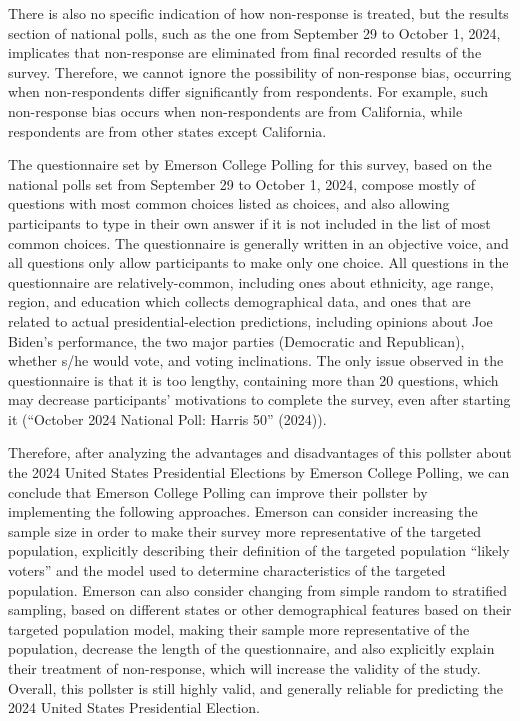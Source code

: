 \documentclass[
  letterpaper,
  DIV=11,
  numbers=noendperiod]{scrartcl}
\begin{document}
There is also no specific indication of how non-response is treated, but
the results section of national polls, such as the one from September 29
to October 1, 2024, implicates that non-response are eliminated from
final recorded results of the survey. Therefore, we cannot ignore the
possibility of non-response bias, occurring when non-respondents differ
significantly from respondents. For example, such non-response bias
occurs when non-respondents are from California, while respondents are
from other states except California.

The questionnaire set by Emerson College Polling for this survey, based
on the national polls set from September 29 to October 1, 2024, compose
mostly of questions with most common choices listed as choices, and also
allowing participants to type in their own answer if it is not included
in the list of most common choices. The questionnaire is generally
written in an objective voice, and all questions only allow participants
to make only one choice. All questions in the questionnaire are
relatively-common, including ones about ethnicity, age range, region,
and education which collects demographical data, and ones that are
related to actual presidential-election predictions, including opinions
about Joe Biden's performance, the two major parties (Democratic and
Republican), whether s/he would vote, and voting inclinations. The only
issue observed in the questionnaire is that it is too lengthy,
containing more than 20 questions, which may decrease participants'
motivations to complete the survey, even after starting it ({``October
2024 National Poll: Harris 50''} (2024)).

Therefore, after analyzing the advantages and disadvantages of this
pollster about the 2024 United States Presidential Elections by Emerson
College Polling, we can conclude that Emerson College Polling can
improve their pollster by implementing the following approaches. Emerson
can consider increasing the sample size in order to make their survey
more representative of the targeted population, explicitly describing
their definition of the targeted population ``likely voters'' and the
model used to determine characteristics of the targeted population.
Emerson can also consider changing from simple random to stratified
sampling, based on different states or other demographical features
based on their targeted population model, making their sample more
representative of the population, decrease the length of the
questionnaire, and also explicitly explain their treatment of
non-response, which will increase the validity of the study. Overall,
this pollster is still highly valid, and generally reliable for
predicting the 2024 United States Presidential Election.
\end{document}
